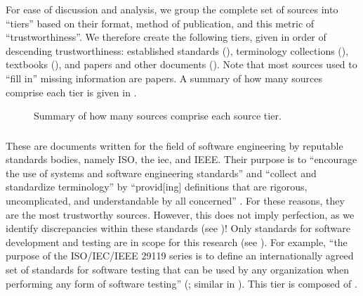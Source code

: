 For ease of discussion and analysis, we group the complete set of sources into
``tiers'' based on their format, method of publication, and this metric of
``trustworthiness''. We therefore create the following tiers, given in order of
descending trustworthiness: established standards (), terminology
collections (), textbooks (), and papers and other
documents (). Note that most sources used to ``fill in'' missing
information are papers. A summary of how many sources comprise each tier is
given in .

\begin{figure}[bt!]
    \centering
    \caption{Summary of how many sources comprise each source tier.}
    \label{fig:sourceSummary}
\end{figure}

\ifnotpaper\newpage\fi

\subsubsection{}
\label{stds}

These are documents written for the field of software engineering by reputable
standards bodies, namely ISO, the \acf{iec}, and IEEE. Their purpose is to
``encourage the use of systems and software engineering standards'' and
``collect and standardize terminology'' by ``provid[ing] definitions that are
rigorous, uncomplicated, and understandable by all concerned''
\citep[p.~viii]{IEEE2017}. For these reasons, they
are the most trustworthy sources. However, this does not imply perfection, as we
identify  %
discrepancies within these standards (see )!
Only standards for software development and testing are in scope for
this research (see ). For example, ``the purpose of the
ISO/IEC/IEEE 29119 series is to define an internationally agreed set of
standards for software testing that can be used by any organization when
performing any form of software testing''
\ifnotpaper(\fi\citeyear[p.~vii]{IEEE2022}\ifnotpaper; similar in
\citeyear[p.~ix]{IEEE2016})\fi.
This tier is composed of .

